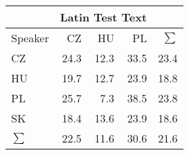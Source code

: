 \begin{tabular}{l|rrr|r}
\hline
 & \multicolumn{3}{c}{Latin Test Text} & \\
\hline
 Speaker   &   CZ &   HU &   PL &   $\sum$ \\
\hline
 CZ        & 24.3 & 12.3 & 33.5 &     23.4 \\
 HU        & 19.7 & 12.7 & 23.9 &     18.8 \\
 PL        & 25.7 &  7.3 & 38.5 &     23.8 \\
 SK        & 18.4 & 13.6 & 23.9 &     18.6 \\
\hline
 $\sum$   & 22.5 & 11.6 & 30.6 &     21.6 \\
\hline
\end{tabular}